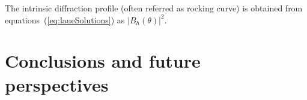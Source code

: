 \documentclass[preprint]{iucr}              %
\begin{document}
The intrinsic diffraction profile (often referred as rocking curve) is obtained from equations~(\ref{eq:laueSolutions}) as $|B_h(\theta)|^2$. 


%
\section{Conclusions and future perspectives}
\label{sec:summary}

















\end{document}
